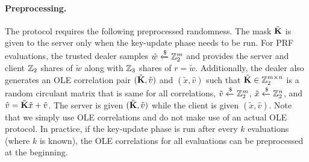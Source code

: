 \paragraph{Preprocessing.} The protocol requires the following preprocessed randomness. The mask $\tilde{\mat{K}}$ is given to the server only when the key-update phase needs to be run. For PRF evaluations, the trusted dealer samples $\tilde{w} \xleftarrow{\$} \mathbb{Z}_2^m$ and provides the server and client $\mathbb{Z}_2$ shares of $\tilde{w}$ along with $\mathbb{Z}_3$ shares of $r = \tilde{w}$. Additionally, the dealer also generates an OLE correlation pair $(\tilde{\mat{K}}, \tilde{v})$ and $(\tilde{x}, \hat{v})$ such that $\tilde{\mat{K}} \in \Z_2^{m \times n}$ is a random circulant matrix that is same for all correlations, $\tilde{v} \xleftarrow{\$} \mathbb{Z}_2^m$, $\tilde{x} \xleftarrow{\$} \mathbb{Z}_2^n$, and $\hat{v} = \tilde{\mat{K}}\tilde{x} + \tilde{v}$. The server is given $(\tilde{\mat{K}}, \tilde{v})$ while the client is given $(\tilde{x}, \hat{v})$. Note that we simply use OLE correlations and do not make use of an actual OLE protocol. In practice, if the key-update phase is run after every $k$ evaluations (where $k$ is known), the OLE correlations for all evaluations can be preprocessed at the beginning. 

